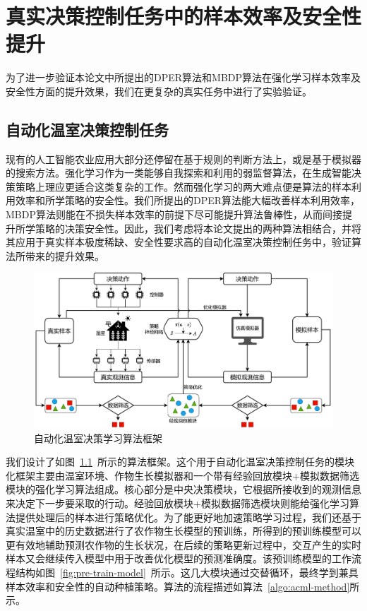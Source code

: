 
\chapter{真实决策控制任务中的样本效率及安全性提升}\label{chap:greenhouse}

为了进一步验证本论文中所提出的DPER算法和MBDP算法在强化学习样本效率及安全性方面的提升效果，我们在更复杂的真实任务中进行了实验验证。

\section{自动化温室决策控制任务}

现有的人工智能农业应用大部分还停留在基于规则的判断方法上，或是基于模拟器的搜索方法。强化学习作为一类能够自我探索和利用的弱监督算法，在生成智能决策策略上理应更适合这类复杂的工作。然而强化学习的两大难点便是算法的样本利用效率和所学策略的安全性。我们所提出的DPER算法能大幅改善样本利用效率，MBDP算法则能在不损失样本效率的前提下尽可能提升算法鲁棒性，从而间接提升所学策略的决策安全性。因此，我们考虑将本论文提出的两种算法相结合，并将其应用于真实样本极度稀缺、安全性要求高的自动化温室决策控制任务中，验证算法所带来的提升效果。

\begin{figure}[ht]
\centering
\includegraphics[width=\textwidth]{figures/framework.pdf}
\caption{自动化温室决策学习算法框架}
\label{fig:framework}
\end{figure}

我们设计了如图~\ref{fig:framework}~所示的算法框架。这个用于自动化温室决策控制任务的模块化框架主要由温室环境、作物生长模拟器和一个带有经验回放模块+模拟数据筛选模块的强化学习算法组成。核心部分是中央决策模块，它根据所接收到的观测信息来决定下一步要采取的行动。经验回放模块+模拟数据筛选模块则能给强化学习算法提供处理后的样本进行策略优化。为了能更好地加速策略学习过程，我们还基于真实温室中的历史数据进行了农作物生长模型的预训练，所得到的预训练模型可以更有效地辅助预测农作物的生长状况，在后续的策略更新过程中，交互产生的实时样本又会继续传入模型中用于改善优化模型的预测准确度。该预训练模型的工作流程结构如图~\ref{fig:pre-train-model}~所示。这几大模块通过交替循环，最终学到兼具样本效率和安全性的自动种植策略。算法的流程描述如算法~\ref{algo:acml-method}所示。

